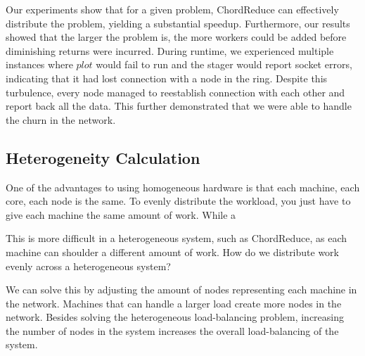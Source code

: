 


Our experiments show that for a given problem, ChordReduce can effectively distribute the problem, yielding a substantial speedup.  
Furthermore, our results showed that the larger the problem is, the more workers could be added before diminishing returns were incurred.  
During runtime, we experienced multiple instances where $plot$ would fail to run and the stager would report socket errors, indicating that it had lost connection with a node in the ring.  Despite this turbulence, every node managed to reestablish connection with each other and report back all the data.  
This further demonstrated that we were able to handle the churn in the network.


\subsection{Heterogeneity Calculation}

One of the advantages to using homogeneous hardware is that each machine, each core, each node is the same.
To evenly distribute the workload, you just have to give each machine the same amount of work.
While a

This is more difficult in a heterogeneous system, such as ChordReduce, as each machine can shoulder a different amount of work.
How do we distribute work evenly across a heterogeneous system?

We can solve this by adjusting the amount of nodes representing each machine in the network.
Machines that can handle a larger load create more nodes in the network.
Besides solving the heterogeneous load-balancing problem, increasing the number of nodes in the system increases the overall load-balancing of the system.

